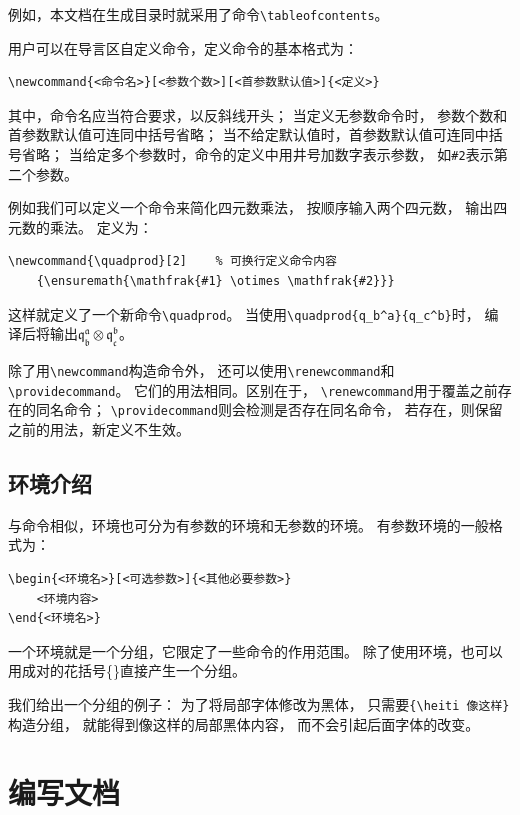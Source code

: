\documentclass{ctexart}
\numberwithin{equation}{section}			%
\newcommand{\quadprod}[2]
	{\ensuremath{\mathfrak{#1} \otimes \mathfrak{#2}}}
\begin{document}
	例如，本文档在生成目录时就采用了命令\verb|\tableofcontents|。
	
	用户可以在导言区自定义命令，定义命令的基本格式为：
	
\begin{lstlisting}
\newcommand{<命令名>}[<参数个数>][<首参数默认值>]{<定义>}
\end{lstlisting}
	
	其中，命令名应当符合要求，以反斜线开头；
	当定义无参数命令时，
	参数个数和首参数默认值可连同中括号省略；
	当不给定默认值时，首参数默认值可连同中括号省略；
	当给定多个参数时，命令的定义中用井号加数字表示参数，
	如\verb|#2|表示第二个参数。
	
	例如我们可以定义一个命令来简化四元数乘法，
	按顺序输入两个四元数，
	输出四元数的乘法。
	定义为：
	
\begin{lstlisting}
\newcommand{\quadprod}[2]    % 可换行定义命令内容
    {\ensuremath{\mathfrak{#1} \otimes \mathfrak{#2}}}
\end{lstlisting}
	
	这样就定义了一个新命令\verb|\quadprod|。
	当使用\verb|\quadprod{q_b^a}{q_c^b}|时，
	编译后将输出\quadprod{q_b^a}{q_c^b}。
	
	除了用\verb|\newcommand|构造命令外，
	还可以使用\verb|\renewcommand|和\verb|\providecommand|。
	它们的用法相同。区别在于，
	\verb|\renewcommand|用于覆盖之前存在的同名命令；
	\verb|\providecommand|则会检测是否存在同名命令，
	若存在，则保留之前的用法，新定义不生效。
	
	\subsection{环境介绍}
	与命令相似，环境也可分为有参数的环境和无参数的环境。
	有参数环境的一般格式为：
	
\begin{lstlisting}
\begin{<环境名>}[<可选参数>]{<其他必要参数>} 
    <环境内容>
\end{<环境名>} 
\end{lstlisting}
	
	一个环境就是一个分组，它限定了一些命令的作用范围。
	除了使用环境，也可以用成对的花括号\{\}直接产生一个分组。
	
	我们给出一个分组的例子：
	为了将局部字体修改为黑体，
	只需要\verb|{\heiti 像这样}|构造分组，
	就能得到{\heiti 像这样}的局部黑体内容，
	而不会引起后面字体的改变。

	\section{编写文档}
\end{document}
